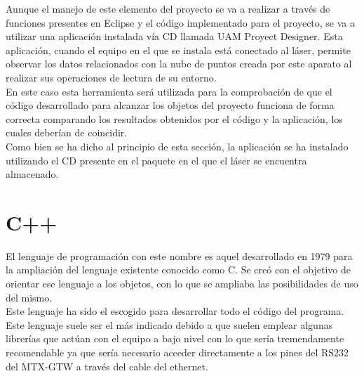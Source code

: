 Aunque el manejo de este elemento del proyecto se va a realizar a través de funciones presentes en Eclipse y el código implementado para el proyecto, se va a utilizar una aplicación instalada vía CD llamada UAM Proyect Designer. Esta aplicación, cuando el equipo en el que se instala está conectado al láser, permite observar los datos relacionados con la nube de puntos creada por este aparato al realizar sus operaciones de lectura de su entorno.\\
En este caso esta herramienta será utilizada para la comprobación de que el código desarrollado para alcanzar los objetos del proyecto funciona de forma correcta comparando los resultados obtenidos por el código y la aplicación, los cuales deberían de coincidir.\\
Como bien se ha dicho al principio de esta sección, la aplicación se ha instalado utilizando el CD presente en el paquete en el que el láser se encuentra almacenado. 

\section{C++}

El lenguaje de programación con este nombre es aquel desarrollado en 1979 para la ampliación del lenguaje existente conocido como C. Se creó con el objetivo de orientar ese lenguaje a los objetos, con lo que se ampliaba las posibilidades de uso del mismo.\\
Este lenguaje ha sido el escogido para desarrollar todo el código del programa. Este lenguaje suele ser el más indicado debido a que suelen emplear algunas librerías que actúan con el equipo a bajo nivel con lo que sería tremendamente recomendable ya que sería necesario acceder directamente a los pines del RS232 del MTX-GTW a través del cable del ethernet.